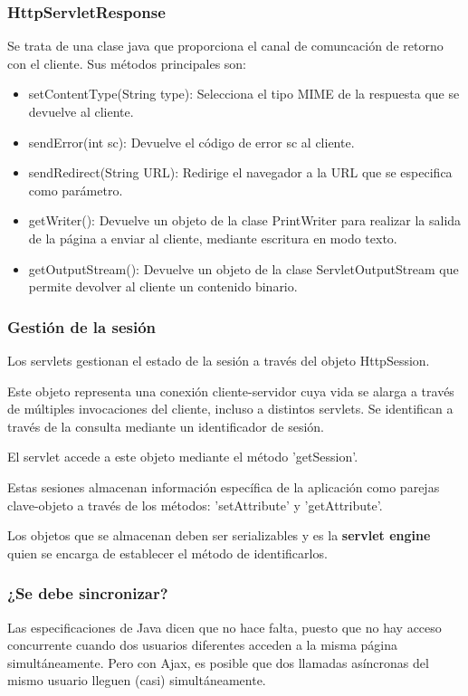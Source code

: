 \documentclass{apuntes}
\begin{document}
\subsubsection{HttpServletResponse}
Se trata de una clase java que proporciona el canal de comuncación de retorno con el cliente. Sus métodos principales son:
\begin{itemize}
\item setContentType(String type): Selecciona el tipo MIME de
la respuesta que se devuelve al cliente.
\item sendError(int sc): Devuelve el código de error sc al cliente.
\item sendRedirect(String URL): Redirige el navegador a la URL que se especifica como parámetro.
\item getWriter(): Devuelve un objeto de la clase PrintWriter
para realizar la salida de la página a enviar al cliente, mediante escritura en modo texto.
\item getOutputStream(): Devuelve un objeto de la clase
ServletOutputStream que permite devolver al cliente un
contenido binario.
\end{itemize}

\subsubsection{Gestión de la sesión}
Los servlets gestionan el estado de la sesión a través del objeto HttpSession.

Este objeto representa una conexión cliente-servidor cuya vida se alarga a través de múltiples invocaciones del cliente, incluso a distintos servlets. Se identifican a través de la consulta mediante un identificador de sesión.

El servlet accede a este objeto mediante el método 'getSession'.

Estas sesiones almacenan información específica de la aplicación como parejas clave-objeto a través de los métodos: 'setAttribute' y 'getAttribute'.

Los objetos que se almacenan deben ser serializables y es la \textbf{servlet engine} quien se encarga de establecer el método de identificarlos.

\subsubsection{¿Se debe sincronizar?}
Las especificaciones de Java dicen que no hace falta, puesto que no hay acceso concurrente cuando dos usuarios diferentes acceden a la misma página simultáneamente. Pero con Ajax, es posible que dos llamadas asíncronas del mismo usuario lleguen (casi) simultáneamente.
\end{document}

